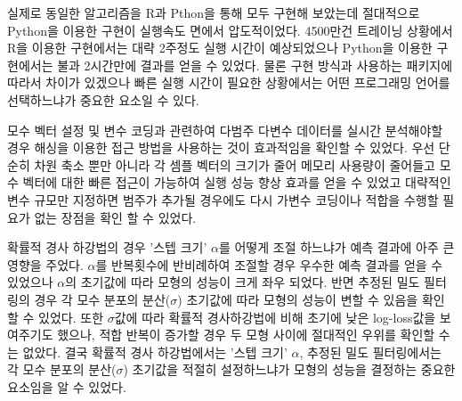 \documentclass[oneside,b5paper,11pt]{article} %
\begin{document}
실제로 동일한 알고리즘을 R과 Pthon을 통해 모두 구현해 보았는데 절대적으로 Python을 이용한 구현이 실행속도 면에서 압도적이었다. 4500만건 트레이닝 상황에서 R을 이용한 구현에서는 대략 2주정도 실행 시간이 예상되었으나 Python을 이용한 구현에서는 불과 2시간만에 결과를 얻을 수 있었다. 물론 구현 방식과 사용하는 패키지에 따라서 차이가 있겠으나 빠른 실행 시간이 필요한 상황에서는 어떤 프로그래밍 언어를 선택하느냐가 중요한 요소일 수 있다.

모수 벡터 설정 및 변수 코딩과 관련하여 다범주 다변수 데이터를 실시간 분석해야할 경우 해싱을 이용한 접근 방법을 사용하는 것이 효과적임을 확인할 수 있었다. 우선 단순히 차원 축소 뿐만 아니라 각 셈플 벡터의 크기가 줄어 메모리 사용량이 줄어들고 모수 벡터에 대한 빠른 접근이 가능하여 실행 성능 향상 효과를 얻을 수 있었고 대략적인 변수 규모만 지정하면 범주가 추가될 경우에도 다시 가변수 코딩이나 적합을 수행할 필요가 없는 장점을 확인 할 수 있었다.

 확률적 경사 하강법의 경우 '스텝 크기' $\alpha$를 어떻게 조절 하느냐가 예측 결과에 아주 큰 영향을 주었다. $\alpha$를 반복횟수에 반비례하여 조절할 경우 우수한 예측 결과를 얻을 수 있었으나 $\alpha$의 초기값에 따라 모형의 성능이 크게 좌우 되었다. 반면 추정된 밀도 필터링의 경우 각 모수 분포의 분산($\sigma$) 초기값에 따라 모형의 성능이 변할 수 있음을 확인 할 수 있었다. 또한 $\sigma$값에 따라 확률적 경사하강법에 비해 초기에 낮은 log-loss값을 보여주기도 했으나, 적합 반복이 증가할 경우 두 모형 사이에 절대적인 우위를 확인할 수는 없았다. 결국 확률적 경사 하강법에서는 '스텝 크기' $\alpha$, 추정된 밀도 필터링에서는 각 모수 분포의 분산($\sigma$) 초기값을 적절히 설정하느냐가 모형의 성능을 결정하는 중요한 요소임을 알 수 있었다.


%
%


\end{document}
